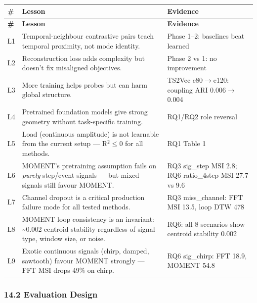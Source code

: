 \documentclass[11pt,a4paper]{article}
\begin{document}
\begin{longtable}{|l|l|l|}
\hline
\textbf{\#} & \textbf{Lesson} & \textbf{Evidence} \\
\hline
\endfirsthead
\hline
\textbf{\#} & \textbf{Lesson} & \textbf{Evidence} \\
\hline
\endhead
\hline
\endfoot
L1 & Temporal-neighbour contrastive pairs teach temporal proximity, not mode identity. & Phase 1--2: baselines beat learned \\
\hline
L2 & Reconstruction loss adds complexity but doesn't fix misaligned objectives. & Phase 2 vs 1: no improvement \\
\hline
L3 & More training helps probes but can harm global structure. & TS2Vec e80$\rightarrow$e120: coupling ARI 0.006$\rightarrow$0.004 \\
\hline
L4 & Pretrained foundation models give strong geometry without task-specific training. & RQ1/RQ2 role reversal \\
\hline
L5 & Load (continuous amplitude) is not learnable from the current setup --- R$^2$$\leq$0 for all methods. & RQ1 Table 1 \\
\hline
L6 & MOMENT's pretraining assumption fails on \textit{purely} step/event signals --- but mixed signals still favour MOMENT. & RQ3 sig\_step MSI 2.8; RQ6 ratio\_4step MSI 27.7 vs 9.6 \\
\hline
L7 & Channel dropout is a critical production failure mode for all tested methods. & RQ3 miss\_channel: FFT MSI 13.5, loop DTW 478 \\
\hline
L8 & MOMENT loop consistency is an invariant: \textasciitilde{}0.002 centroid stability regardless of signal type, window size, or noise. & RQ6: all 8 scenarios show centroid stability 0.002 \\
\hline
L9 & Exotic continuous signals (chirp, damped, sawtooth) favour MOMENT strongly --- FFT MSI drops 49\% on chirp. & RQ6 sig\_chirp: FFT 18.9, MOMENT 54.8 \\
\hline
\end{longtable}

\subsubsection{14.2 Evaluation Design}
\end{document}
